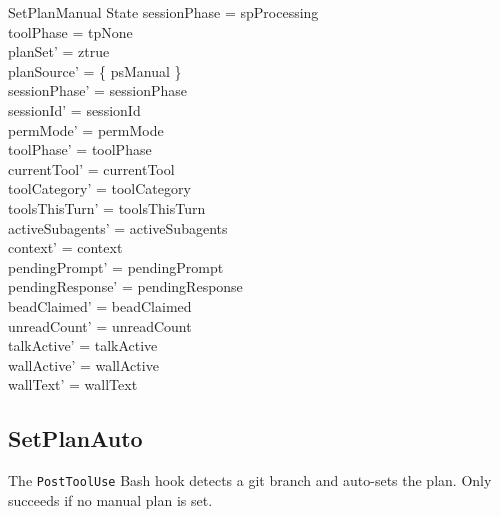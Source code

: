\documentclass[a4paper,10pt,fleqn]{article}
\begin{document}
\begin{schema}{SetPlanManual}
  \Delta State
  \where
  sessionPhase = spProcessing \\
  toolPhase = tpNone \\
  planSet' = ztrue \\
  planSource' = \{ psManual \} \\
  sessionPhase' = sessionPhase \\
  sessionId' = sessionId \\
  permMode' = permMode \\
  toolPhase' = toolPhase \\
  currentTool' = currentTool \\
  toolCategory' = toolCategory \\
  toolsThisTurn' = toolsThisTurn \\
  activeSubagents' = activeSubagents \\
  context' = context \\
  pendingPrompt' = pendingPrompt \\
  pendingResponse' = pendingResponse \\
  beadClaimed' = beadClaimed \\
  unreadCount' = unreadCount \\
  talkActive' = talkActive \\
  wallActive' = wallActive \\
  wallText' = wallText
\end{schema}

\subsection{SetPlanAuto}

The \texttt{PostToolUse} Bash hook detects a git branch and
auto-sets the plan. Only succeeds if no manual plan is set.
\end{document}
